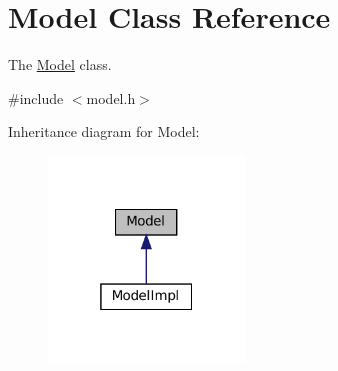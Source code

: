 \hypertarget{classModel}{}\section{Model Class Reference}
\label{classModel}


The \hyperlink{classModel}{Model} class.  




{\ttfamily \#include $<$model.\+h$>$}



Inheritance diagram for Model\+:
\nopagebreak
\begin{figure}[H]
\begin{center}
\leavevmode
\includegraphics[width=148pt]{classModel__inherit__graph}
\end{center}
\end{figure}
